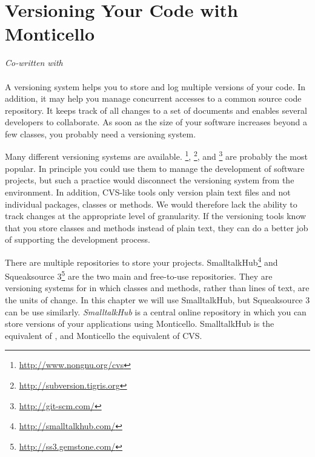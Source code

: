 \documentclass[a4paper,10pt,twoside]{book}
\begin{document}
	\renewcommand{\nnbb}[2]{} %
	\sloppy
	
\fi

	\newcommand{\Mont}{Monticello\xspace}
	\newcommand{\MCB}{\Mont browser\xspace}
	\newcommand{\RI}{repository inspector\xspace}

\chapter{Versioning Your Code with \Mont}

\emph{Co-written with \\ \authoroscar} \\


A versioning system helps you to store and log multiple versions of your code. In addition, it may help you manage concurrent accesses to a common source code repository. It keeps track of all changes to a set of documents and enables several developers to collaborate. As soon as the size of your software increases beyond a few classes, you probably need a versioning system.

Many different versioning systems are available. \footnote{\url{http://www.nongnu.org/cvs}}, \footnote{\url{http://subversion.tigris.org}}, and \footnote{\url{http://git-scm.com/}} are probably the most popular.
In principle you could use them to manage the development of \pharo software projects, but such a practice would disconnect the versioning system from the \pharo environment.
In addition, CVS-like tools only version plain text files and not individual packages, classes or methods. We would therefore lack the ability to track changes at the appropriate level of granularity. 
If the versioning tools know that you store classes and methods instead of plain text,
they can do a better job of supporting the development process.


There are multiple repositories to store your projects. SmalltalkHub\footnote{\url{http://smalltalkhub.com/}} and Squeaksource 3\footnote{\url{http://ss3.gemstone.com/}} are the two main and free-to-use repositories.
They are versioning systems for \pharo in which classes and methods, rather than lines of text,
are the units of change. In this chapter we will use SmalltalkHub, but Squeaksource 3 can be use similarly. \emph{SmalltalkHub} is a central online repository in which you can store versions of your applications using \Mont. SmalltalkHub is the equivalent of , and \Mont the equivalent of CVS. 
\end{document}
